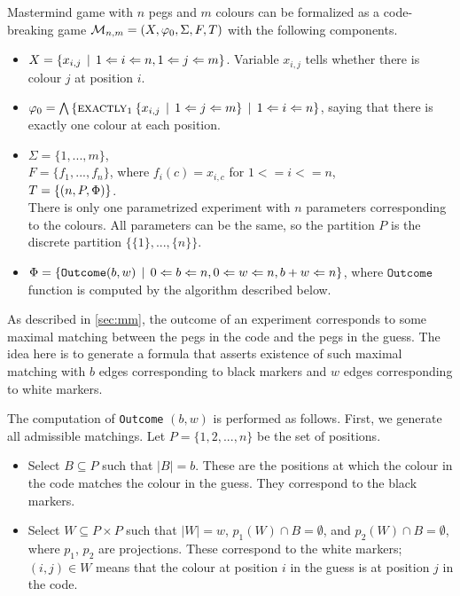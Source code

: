 \begin{example}[Mastermind] \label{ex:form-mastermind}
Mastermind game with $n$ pegs and $m$ colours can be formalized as
a code-breaking game
$\mathcal{M}_{n,m} = (X, \varphi_0, \Sigma, F, T)$
  with the following components.

\begin{itemize}
\item
$X = \{x_{i,j} \:\:|\:\: 1<=i<=n, 1<=j<=m \}$.
  Variable $x_{i,j}$ tells whether there is colour $j$ at position $i$.
\item
$\varphi_0 = \bigwedge\left\{
  \textsc{exactly}_{1}\: \{x_{i,j} \:\:|\:\: 1<=j<=m\} \:\:|\:\: 1<=i<=n\right\}$, saying that
  there is exactly one colour at each position.
\item $\Sigma = \{1,...,m\}$, \\
 $F = \{ f_1, ..., f_n \}$, where $f_i(c) = x_{i,c}$ for $1<=i<=n$, \\
 $T = \{ (n, P, \Phi) \}$.\\
There is only one parametrized experiment with $n$ parameters corresponding
  to the colours.
All parameters can be the same,
  so the partition $P$ is the discrete partition $\{\{1\},...,\{n\}\}$.
\item $\Phi = \{ \texttt{Outcome}(b, w) \:\:|\:\: 0<=b<=n, 0<=w<=n, b+w<=n \}$,
where $\texttt{Outcome}$ function is computed by the algorithm described below.
\end{itemize}

As described in \autoref{sec:mm},
  the outcome of an experiment corresponds
  to some maximal matching between
  the pegs in the code and the pegs in the guess.
The idea here is to generate a formula that asserts
  existence of such maximal matching
  with $b$ edges corresponding to black markers and
  $w$ edges corresponding to white markers.

The computation of \texttt{Outcome} $(b, w)$ is performed as follows.
First, we generate all admissible matchings.
Let $P = \{1,2,...,n\}$ be the set of positions.
\begin{itemize}
\item Select $B\subseteq P$ such that $|B| = b$.
  These are the positions at which the colour
  in the code matches the colour in the guess.
  They correspond to the black markers.
\item Select $W\subseteq P\times P$ such that $|W| = w$,
  $p_1(W)\cap B = \emptyset$, and $p_2(W)\cap B = \emptyset$,
  where $p_1$, $p_2$ are projections.
  These correspond to the white markers; $(i, j) \in W$ means that the colour
  at position $i$ in the guess is at position $j$ in the code.
\end{itemize}


\end{example}
